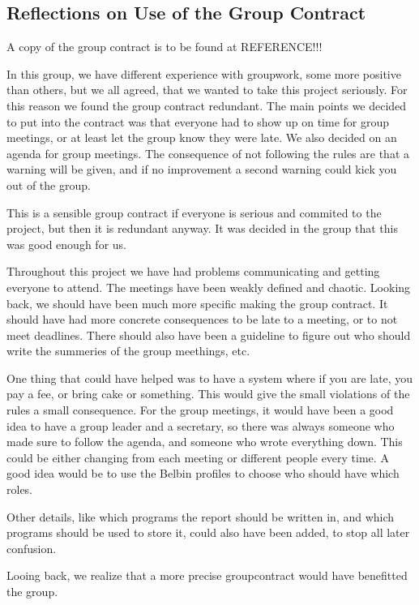 

\subsection{Reflections on Use of the Group Contract}

A copy of the group contract is to be found at REFERENCE!!! 

In this group, we have different experience with groupwork, some more positive than others, but we all agreed, that we wanted to take this project seriously. For this reason we found the group contract redundant. 
The main points we decided to put into the contract was that everyone had to show up on time for group meetings, or at least let the group know they were late. We also decided on an agenda for group meetings. The consequence of not following the rules are that a warning will be given, and if no improvement a second warning could kick you out of the group. 

This is a sensible group contract if everyone is serious and commited to the project, but then it is redundant anyway. It was decided in the group that this was good enough for us. 

Throughout this project we have had problems communicating and getting everyone to attend. The meetings have been weakly defined and chaotic. 
Looking back, we should have been much more specific making the group contract. It should have had more concrete consequences to be late to a meeting, or to not meet deadlines. There should also have been a guideline to figure out who should write the summeries of the group meethings, etc. 

One thing that could have helped was to have a system where if you are late, you pay a fee, or bring cake or something. This would give the small violations of the rules a small consequence. 
For the group meetings, it would have been a good idea to have a group leader and a secretary, so there was always someone who made sure to follow the agenda, and someone who wrote everything down. This could be either changing from each meeting or different people every time. A good idea would be to use the Belbin profiles to choose who should have which roles. 

Other details, like which programs the report should be written in, and which programs should be used to store it, could also have been added, to stop all later confusion. 

Looing back, we realize that a more precise groupcontract would have benefitted the group. 





